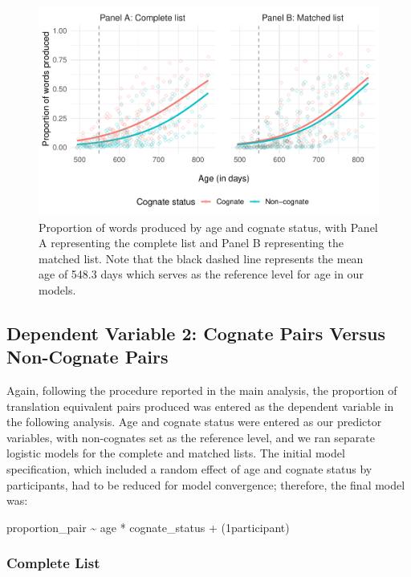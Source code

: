 \documentclass[
  ,man,floatsintext]{apa6}
\begin{document}
\begin{figure}

{\centering \includegraphics[width=1.2\linewidth]{CogVocab_supplemental_files/figure-latex/FigS1-1} 

}

\caption{Proportion of words produced by age and cognate status, with Panel A representing the complete list and Panel B representing the matched list. Note that the black dashed line represents the mean age of 548.3 days which serves as the reference level for age in our models.}\label{fig:FigS1}
\end{figure}

\hypertarget{dependent-variable-2-cognate-pairs-versus-non-cognate-pairs}{%
\subsection{Dependent Variable 2: Cognate Pairs Versus Non-Cognate Pairs}\label{dependent-variable-2-cognate-pairs-versus-non-cognate-pairs}}

Again, following the procedure reported in the main analysis, the proportion of translation equivalent pairs produced was entered as the dependent variable in the following analysis. Age and cognate status were entered as our predictor variables, with non-cognates set as the reference level, and we ran separate logistic models for the complete and matched lists. The initial model specification, which included a random effect of age and cognate status by participants, had to be reduced for model convergence; therefore, the final model was:

proportion\_pair \textasciitilde{} age * cognate\_status + (1\textbar participant)

\hypertarget{complete-list-1}{%
\subsubsection{Complete List}\label{complete-list-1}}
\end{document}
